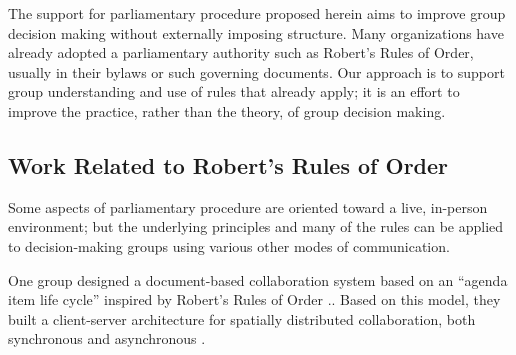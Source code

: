 \documentclass{acm_proc_article-sp}
\begin{document}

The support for parliamentary procedure proposed herein aims to improve group decision making without externally imposing structure. Many organizations have already adopted a parliamentary authority such as Robert's Rules of Order, usually in their bylaws or such governing documents. Our approach is to support group understanding and use of rules that already apply; it is an effort to improve the practice, rather than the theory, of group decision making.




% 
% 

\subsection{Work Related to Robert's Rules of Order}

Some aspects of parliamentary procedure are oriented toward a live, in-person environment; but the underlying principles and many of the rules can be applied to decision-making groups using various other modes of communication.

One group designed a document-based collaboration system based on an ``agenda item life cycle'' inspired by Robert's Rules of Order \cite{chang:rule-mitigated}.. Based on this model, they built a client-server architecture for spatially distributed collaboration, both synchronous and asynchronous \cite{chang:rule-mitigated,zhang:rule-mitigated}.
\end{document}

